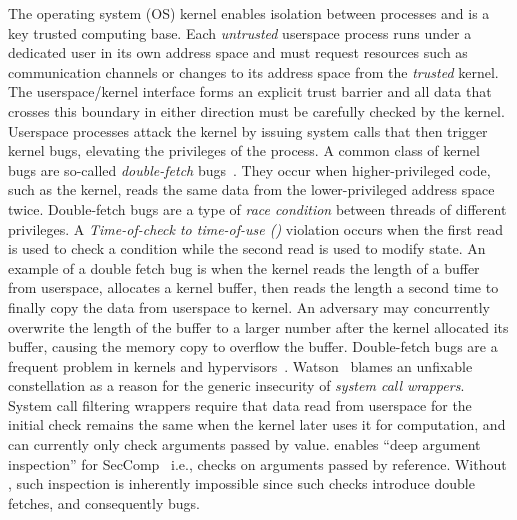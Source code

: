\documentclass[letterpaper,twocolumn,10pt]{article}
\begin{document}
The operating system (OS) kernel enables isolation between processes and is 
a key trusted computing
base. Each \emph{untrusted} userspace process runs under a
dedicated user in its own address space and must request resources such as
communication channels or changes to its address space from the \emph{trusted}
kernel. The userspace/kernel interface forms an explicit trust barrier
and all data that crosses this boundary in either direction must be carefully 
checked by the kernel.
%
Userspace processes attack the kernel by issuing system calls that then trigger
kernel bugs, elevating the privileges of the process.
%
A common class of kernel bugs are so-called \emph{double-fetch}
bugs~\cite{serna08doublefetch, twizsgrakky07ring0, wilhelm2016xenpwn,
wang2018survey}. They occur when higher-privileged code, such as
the kernel, reads the same data from the lower-privileged address space twice.
%
Double-fetch bugs are a type of
\emph{race condition} between threads of different privileges. A
\emph{Time-of-check to time-of-use (\tocttou)} violation occurs when the first
read is used to check a condition while the second read is used to modify
state.
%
An example of a double fetch bug is when the kernel reads the length of a buffer
from userspace, allocates a kernel buffer, then reads the length a second time
to finally copy the data from userspace to kernel. An adversary may concurrently
overwrite the length of the buffer to a larger number after the kernel allocated
its buffer, causing the memory copy to overflow the buffer.
%
Double-fetch bugs are a frequent problem in kernels and
hypervisors~\cite{cve201812633, cve202012652, cve20131332, cve201920610,
cve20158550, cve201610439, cve201610435, cve201610433, cve20195519,
cve20168438}. 
Watson~\cite{watson2007exploiting} blames an unfixable \tocttou
constellation as a reason for the generic insecurity of \emph{system call
wrappers}. 
System call filtering wrappers require that data read from userspace for the
initial check remains the same when the kernel later uses it for computation, 
and can currently only check arguments passed by value.
\tiktok enables ``deep argument inspection'' for SecComp~\cite{seccomp_deep, seccomp}
i.e., checks on arguments passed by reference.
Without \tiktok, such inspection is inherently impossible since such checks 
introduce double fetches, and consequently \tocttou bugs.
\end{document}

